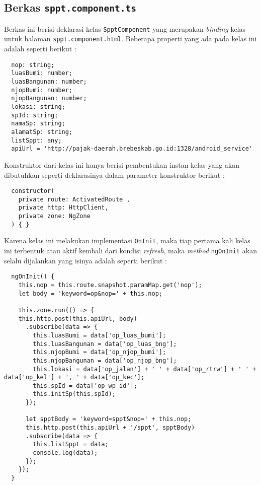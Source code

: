\documentclass[pdftex,12pt, oneside]{article}
\begin{document}
\subsection{Berkas \texttt{sppt.component.ts}}

Berkas ini berisi deklarasi kelas \texttt{SpptComponent} yang merupakan \textit{binding} kelas untuk halaman \texttt{sppt.component.html}. Beberapa properti yang ada pada kelas ini adalah seperti berikut :

\begin{lstlisting}
  nop: string;
  luasBumi: number;
  luasBangunan: number;
  njopBumi: number;
  njopBangunan: number;
  lokasi: string;
  spId: string;
  namaSp: string;
  alamatSp: string;
  listSppt: any;
  apiUrl = 'http://pajak-daerah.brebeskab.go.id:1328/android_service'
\end{lstlisting}

Konstruktor dari kelas ini hanya berisi pembentukan instan kelas yang akan dibutuhkan seperti deklarasinya dalam parameter konstruktor berikut :

\begin{lstlisting}
  constructor(
    private route: ActivatedRoute ,
    private http: HttpClient, 
    private zone: NgZone
  ) { }
\end{lstlisting}

Karena kelas ini melakukan implementasi \texttt{OnInit}, maka tiap pertama kali kelas ini terbentuk atau aktif kembali dari kondisi \textit{refresh}, maka \textit{method} \texttt{ngOnInit} akan selalu dijalankan yang isinya adalah seperti berikut :

\begin{lstlisting}
  ngOnInit() {
    this.nop = this.route.snapshot.paramMap.get('nop');
    let body = 'keyword=op&nop=' + this.nop;

    this.zone.run(() => {
    this.http.post(this.apiUrl, body)
      .subscribe(data => {
        this.luasBumi = data['op_luas_bumi'];
        this.luasBangunan = data['op_luas_bng'];
        this.njopBumi = data['op_njop_bumi'];
        this.njopBangunan = data['op_njop_bng'];
        this.lokasi = data['op_jalan'] + ' ' + data['op_rtrw'] + ' ' + data['op_kel'] + ', ' + data['op_kec'];
        this.spId = data['op_wp_id'];
        this.initSp(this.spId);
      });
    
      let spptBody = 'keyword=sppt&nop=' + this.nop;  
      this.http.post(this.apiUrl + '/sppt', spptBody) 
      .subscribe(data => {
        this.listSppt = data;
        console.log(data);
      });
    });
  }
\end{lstlisting}
\end{document}

